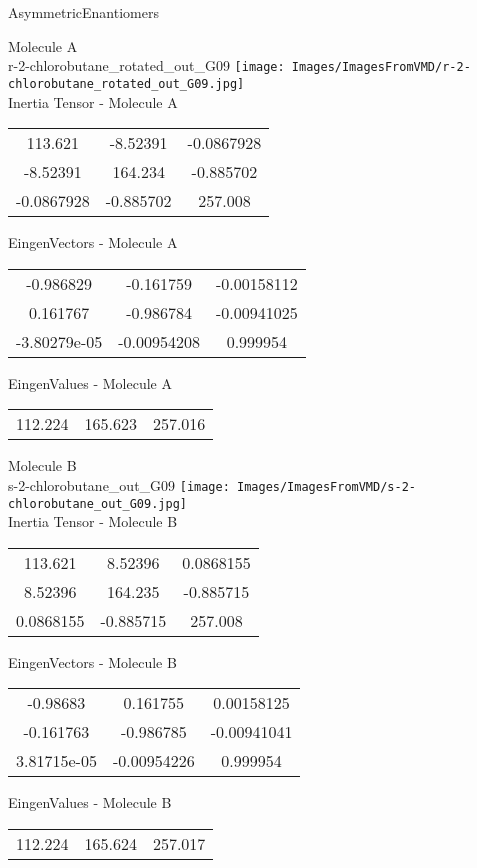 \vtab[-2cm]
\begin{center}
{\large AsymmetricEnantiomers}
\end{center}
\begin{multicols}{2}
\begin{center}
Molecule A \\ 
r-2-chlorobutane\_rotated\_out\_G09
\texttt{[image: Images/ImagesFromVMD/r-2-chlorobutane\_rotated\_out\_G09.jpg]}
\\
Inertia Tensor - Molecule A \\
\vtab
\begin{tabular}{|c c c|}
113.621	 & 	-8.52391	 & 	-0.0867928	 \\
-8.52391	 & 	164.234	 & 	-0.885702	 \\
-0.0867928	 & 	-0.885702	 & 	257.008
\end{tabular}

\vtab
 EingenVectors - Molecule A     \\
\vtab
\begin{tabular}{|c c c|}
-0.986829	 & 	-0.161759	 & 	-0.00158112	 \\
0.161767	 & 	-0.986784	 & 	-0.00941025	 \\
-3.80279e-05	 & 	-0.00954208	 & 	0.999954
\end{tabular}

\vtab
 EingenValues - Molecule A     \\
\vtab
\begin{tabular}{|c c c|}
112.224	 & 	165.623	 & 	257.016
\end{tabular}
\columnbreak

Molecule B \\ 
s-2-chlorobutane\_out\_G09
\texttt{[image: Images/ImagesFromVMD/s-2-chlorobutane\_out\_G09.jpg]}
\\
Inertia Tensor - Molecule B \\
\vtab
\begin{tabular}{|c c c|}
113.621	 & 	8.52396	 & 	0.0868155	 \\
8.52396	 & 	164.235	 & 	-0.885715	 \\
0.0868155	 & 	-0.885715	 & 	257.008
\end{tabular}

\vtab
 EingenVectors - Molecule B     \\
\vtab
\begin{tabular}{|c c c|}
-0.98683	 & 	0.161755	 & 	0.00158125	 \\
-0.161763	 & 	-0.986785	 & 	-0.00941041	 \\
3.81715e-05	 & 	-0.00954226	 & 	0.999954
\end{tabular}

\vtab
 EingenValues - Molecule B     \\
\vtab
\begin{tabular}{|c c c|}
112.224	 & 	165.624	 & 	257.017
\end{tabular}

\end{center}
\end{multicols}
